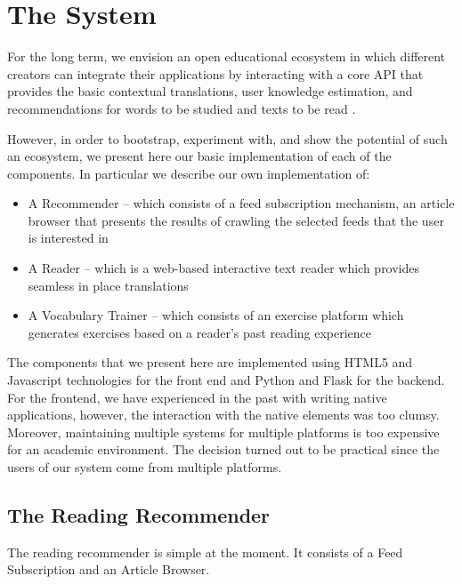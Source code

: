 
\newpage
\section{The System}

For the long term, we envision an open educational ecosystem in which different creators can integrate their applications by interacting with a core API that provides the basic contextual translations, user knowledge estimation, and recommendations for words to be studied and texts to be read \cite{Lungu16}. 

However, in order to bootstrap, experiment with, and show the potential of such an ecosystem, we present here our basic implementation of each of the components. In particular we describe our own implementation of: 

\begin{itemize}

  \item A Recommender -- which consists of a feed subscription mechanism, an article browser that presents the results of crawling the selected feeds that the user is interested in

  \item A Reader -- which is a web-based interactive text reader which provides seamless in place translations
  
  \item A Vocabulary Trainer -- which consists of an exercise platform which generates exercises based on a reader's past reading experience

\end{itemize}

The components that we present here are implemented using HTML5 and Javascript technologies for the front end and Python and Flask for the backend. For the frontend, we have experienced in the past with writing native applications, however, the interaction with the native elements was too clumsy. Moreover, maintaining multiple systems for multiple platforms is too expensive for an academic environment. The decision turned out to be practical since the users of our system come from multiple platforms.


\subsection{The Reading Recommender}
The reading recommender is simple at the moment. It consists of a Feed Subscription and an Article Browser.

